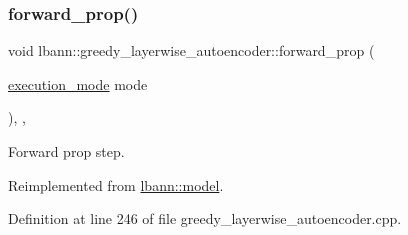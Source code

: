 \subsubsection{\texorpdfstring{forward\+\_\+prop()}{forward\_prop()}}
{\footnotesize\ttfamily void lbann\+::greedy\+\_\+layerwise\+\_\+autoencoder\+::forward\+\_\+prop (\begin{DoxyParamCaption}\item[{\hyperlink{base_8hpp_a2781a159088df64ed7d47cc91c4dc0a8}{execution\+\_\+mode}}]{mode }\end{DoxyParamCaption})\hspace{0.3cm}{\ttfamily [override]}, {\ttfamily [protected]}, {\ttfamily [virtual]}}

Forward prop step. 

Reimplemented from \hyperlink{classlbann_1_1model_adc4f845c8e292afe2d8686f459729484}{lbann\+::model}.



Definition at line 246 of file greedy\+\_\+layerwise\+\_\+autoencoder.\+cpp.


